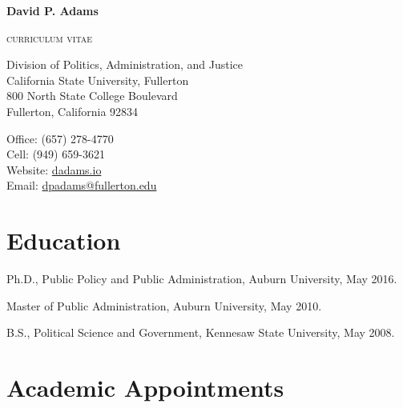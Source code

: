 \documentclass[12pt,letterpaper]{article}
\def\name{David P. Adams}
\renewenvironment{itemize}{
  \begin{list}{}{
    \setlength{\leftmargin}{1.5em}
    \setlength{\itemsep}{0.25em}
    \setlength{\parskip}{0pt}
    \setlength{\parsep}{0.25em}
  }
}{
  \end{list}
}
\begin{document}
	
	
\centerline{\huge \bf \name}
\smallskip
\centerline{\small{\textsc{curriculum vitae}}}

\bigskip

\noindent

\begin{minipage}[t]{0.55\textwidth}
    Division of Politics, Administration, and Justice \\
    California State University, Fullerton \\
    800 North State College Boulevard  \\
    Fullerton, California 92834
  \end{minipage}
  \hspace{1in}
  \begin{minipage}[t]{0.375\textwidth}
    Office: \hspace{5.1em}(657) 278-4770 \\
    Cell: \hspace{5.6em} (949) 659-3621 \\
    Website: \hspace{6.25em}\href{https://dadams.io}{dadams.io} \\
    Email: \hspace{1.25em}\href{mailto:dpadams@fullerton.edu}{dpadams@fullerton.edu}
  \end{minipage}


  \section*{Education}

  \begin{itemize}\leftmargin=2pt\itemindent=-15pt
  \item Ph.D., Public Policy and Public Administration, Auburn University, May 2016. \vspace{0.2cm}
  \item Master of Public Administration, Auburn University, May 2010. \vspace{0.2cm}
  \item B.S., Political Science and Government, Kennesaw State University, May 2008.
  \end{itemize}
  
  \section*{Academic Appointments}
\end{document}
